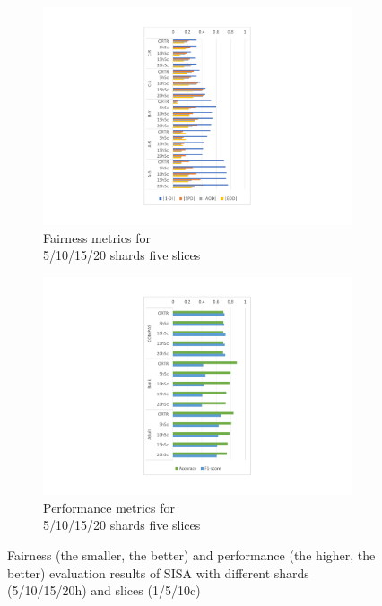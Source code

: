 \begin{figure}[t!]
 \begin{subfigure}[b]{0.24\textwidth}
         \centering
         \includegraphics[width=\textwidth]{assets/rq1-fairness-5slice-vertical.pdf}
         \caption{Fairness metrics for \\ 5/10/15/20 shards five slices}
         \label{fig:rq1-fairness-5slice}
 \end{subfigure}
    \begin{subfigure}[b]{0.24\textwidth}
         \centering
         \includegraphics[width=\textwidth]{assets/rq1-performance-5slice-vertical.pdf}
         \caption{Performance metrics for \\ 5/10/15/20 shards five slices}
         \label{fig:rq1-performance-5slice}
 \end{subfigure}
  \caption{Fairness (the smaller, the better) and performance (the higher, the better) evaluation results of SISA with different shards (5/10/15/20h) and slices (1/5/10c)}
  \label{fig:rq1}
\end{figure}

